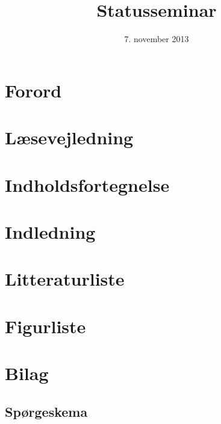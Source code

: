 


\fancyhead{} %
\fancyhead[RO]{\rapportnavn}
\fancyhead[LO]{\pagetitle}
\fancyhead[CO]{\gruppenummer}
\fancyfoot{} %
\fancyfoot[CO]{\sidetal}

\listoffixmes
\clearpage

\title{\rapportnavn\\ Statusseminar}
\author{\gruppenummer}
\date{7. november 2013}

\maketitle

\section*{Forord}

\section*{Læsevejledning}

\clearpage

\section*{Indholdsfortegnelse}
\renewcommand*\contentsname{}
\tableofcontents
\clearpage

\section{Indledning}

\clearpage



\section{Litteraturliste}

\clearpage

\section{Figurliste}
\listoffigures
\clearpage

\section{Bilag}
\subsection{Spørgeskema}
\label{sec:sporgeskema}


